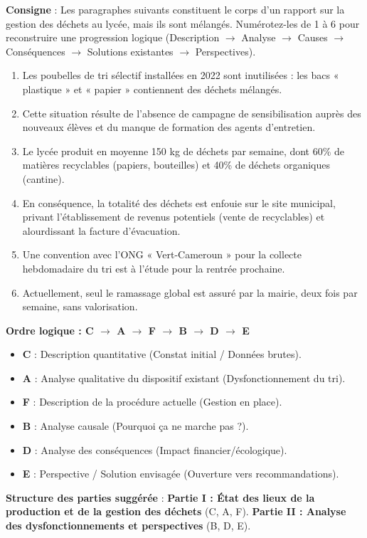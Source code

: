 \documentclass[11pt]{article}
\begin{document}
\begin{exercice}
\textbf{Consigne} : Les paragraphes suivants constituent le corps d'un rapport sur la gestion des déchets au lycée, mais ils sont mélangés. Numérotez-les de 1 à 6 pour reconstruire une progression logique (Description $\rightarrow$ Analyse $\rightarrow$ Causes $\rightarrow$ Conséquences $\rightarrow$ Solutions existantes $\rightarrow$ Perspectives).

\begin{enumerate}
    \item[A] Les poubelles de tri sélectif installées en 2022 sont inutilisées : les bacs « plastique » et « papier » contiennent des déchets mélangés.
    \item[B] Cette situation résulte de l'absence de campagne de sensibilisation auprès des nouveaux élèves et du manque de formation des agents d'entretien.
    \item[C] Le lycée produit en moyenne 150 kg de déchets par semaine, dont 60\% de matières recyclables (papiers, bouteilles) et 40\% de déchets organiques (cantine).
    \item[D] En conséquence, la totalité des déchets est enfouie sur le site municipal, privant l'établissement de revenus potentiels (vente de recyclables) et alourdissant la facture d'évacuation.
    \item[E] Une convention avec l'ONG « Vert-Cameroun » pour la collecte hebdomadaire du tri est à l'étude pour la rentrée prochaine.
    \item[F] Actuellement, seul le ramassage global est assuré par la mairie, deux fois par semaine, sans valorisation.
\end{enumerate}
\end{exercice}

\begin{corrige}
\textbf{Ordre logique : C $\rightarrow$ A $\rightarrow$ F $\rightarrow$ B $\rightarrow$ D $\rightarrow$ E}
\begin{itemize}
    \item \textbf{C} : Description quantitative (Constat initial / Données brutes).
    \item \textbf{A} : Analyse qualitative du dispositif existant (Dysfonctionnement du tri).
    \item \textbf{F} : Description de la procédure actuelle (Gestion en place).
    \item \textbf{B} : Analyse causale (Pourquoi ça ne marche pas ?).
    \item \textbf{D} : Analyse des conséquences (Impact financier/écologique).
    \item \textbf{E} : Perspective / Solution envisagée (Ouverture vers recommandations).
\end{itemize}
\textbf{Structure des parties suggérée} :
\textbf{Partie I : État des lieux de la production et de la gestion des déchets} (C, A, F).
\textbf{Partie II : Analyse des dysfonctionnements et perspectives} (B, D, E).
\end{corrige}
\end{document}
